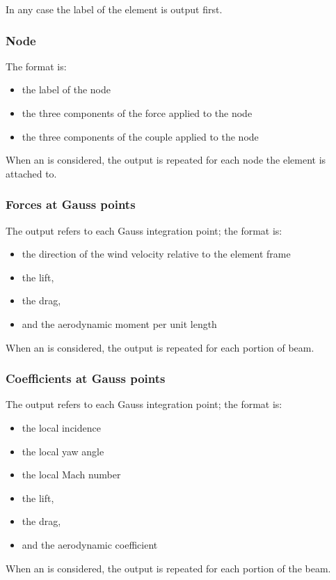 \noindent
In any case the label of the element is output first.

\subsubsection{Node}
The format is:
\begin{itemize}
    \item the label of the node
    \item the three components of the force applied to the node
    \item the three components of the couple applied to the node
\end{itemize}
When an  is considered, the output is repeated 
for each node the element is attached to.

\subsubsection{Forces at Gauss points}
The output refers to each Gauss integration point; the format is:
\begin{itemize}
    \item the direction of the wind velocity relative to the element frame
    \item the lift,
    \item the drag,
    \item and the aerodynamic moment per unit length
\end{itemize}
When an  is considered, the output 
is repeated for each portion of beam.

\subsubsection{Coefficients at Gauss points}
The output refers to each Gauss integration point; the format is:
\begin{itemize}
    \item the local incidence
    \item the local yaw angle
    \item the local Mach number
    \item the lift,
    \item the drag,
    \item and the aerodynamic coefficient
\end{itemize}
When an  is considered, the output 
is repeated for each portion of the beam.





